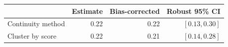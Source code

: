 \begin{center}
\small\renewcommand{\arraystretch}{1.3}
\begin{tabular}{@{}lrrr@{}}\toprule
 & Estimate & Bias-corrected & Robust 95\% CI\\\midrule
Continuity method & 0.22 & 0.22 & $[0.13, 0.30]$\\
Cluster by score & 0.22 & 0.21 & $[0.14, 0.28]$\\
\bottomrule\end{tabular}
\end{center}
